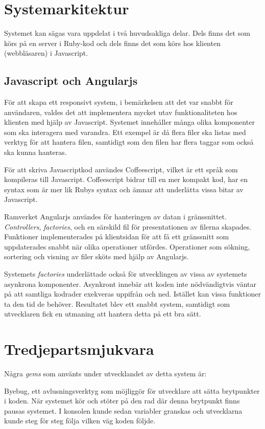 \section{Systemarkitektur}
Systemet kan sägas vara uppdelat i två huvudsakliga delar. Dels finns det som körs på en server i Ruby-kod och dels finns det som körs hos klienten (webbläsaren) i Javascript.

\subsection{Javascript och Angularjs}
För att skapa ett responsivt system, i bemärkelsen att det var snabbt för användaren, valdes det att implementera mycket utav funktionaliteten hos klienten med hjälp av Javascript. Systemet innehåller många olika komponenter som ska interagera med varandra. Ett exempel är då flera filer ska listas med verktyg för att hantera filen, samtidigt som den filen har flera taggar som också ska kunna hanteras.

För att skriva Javascriptkod användes Coffeescript, vilket är ett språk som kompileras till Javascript. Coffeescript bidrar till en mer kompakt kod, har en syntax som är mer lik Rubys syntax och ämnar att underlätta vissa bitar av Javascript. \cite{coffee}

Ramverket Angularjs användes för hanteringen av datan i gränssnittet. \textit{Controllers}, \textit{factories}\cite{angularwebb}, och en särskild fil för presentationen av filerna skapades. Funktioner implementerades på klientsidan för att få ett gränssnitt som uppdaterades snabbt när olika operationer utfördes. Operationer som sökning, sortering och visning av filer sköts med hjälp av Angularjs.

Systemets \textit{factories} underlättade också för utvecklingen av vissa av systemets asynkrona komponenter. Asynkront innebär att koden inte nödvändigtvis väntar på att samtliga kodrader exekveras uppifrån och ned. Istället kan vissa funktioner ta den tid de behöver. Resultatet blev ett snabbt system, samtidigt som utvecklaren fick en utmaning att hantera detta på ett bra sätt.  

\section{Tredjepartsmjukvara}
Några \textit{gems} som använts under utvecklandet av detta system är:

Byebug, ett avlusningsverktyg som möjliggör för utvecklare att sätta brytpunkter i koden. När systemet kör och stöter på den rad där denna brytpunkt finns pausas systemet. I konsolen kunde sedan variabler granskas och utvecklarna kunde steg för steg följa vilken väg koden följde.

